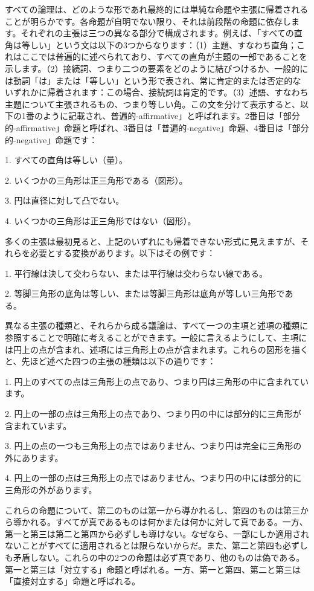 \documentclass[a4paper,11pt,openany]{ltjsbook}
\begin{document}
すべての論理は、どのような形であれ最終的には単純な命題や主張に帰着されることが明らかです。各命題が自明でない限り、それは前段階の命題に依存します。それぞれの主張は三つの異なる部分で構成されます。例えば、「すべての直角は等しい」という文は以下の3つからなります：（1）主題、すなわち直角；これはここでは普遍的に述べられており、すべての直角が主題の一部であることを示します。（2）接続詞、つまり二つの要素をどのように結びつけるか、一般的には動詞「は」または「等しい」という形で表され、常に肯定的または否定的ないずれかに帰着されます：この場合、接続詞は肯定的です。（3）述語、すなわち主題について主張されるもの、つまり等しい角。この文を分けて表示すると、以下の1番のように記載され、普遍的-affirmative」と呼ばれます。2番目は「部分的-affirmative」命題と呼ばれ、3番目は「普遍的-negative」命題、4番目は「部分的-negative」命題です：

1. すべての直角は等しい（量）。

2. いくつかの三角形は正三角形である（図形）。

3. 円は直径に対して凸でない。

4. いくつかの三角形は正三角形ではない（図形）。

多くの主張は最初見ると、上記のいずれにも帰着できない形式に見えますが、それらを必要とする変換があります。以下はその例です：

1. 平行線は決して交わらない、または平行線は交わらない線である。

2. 等脚三角形の底角は等しい、または等脚三角形は底角が等しい三角形である。

異なる主張の種類と、それらから成る議論は、すべて一つの主項と述項の種類に参照することで明確に考えることができます。一般に言えるようにして、主項には円上の点が含まれ、述項には三角形上の点が含まれます。これらの図形を描くと、先ほど述べた四つの主張の種類は以下の通りです：

1. 円上のすべての点は三角形上の点であり、つまり円は三角形の中に含まれています。

2. 円上の一部の点は三角形上の点であり、つまり円の中には部分的に三角形が含まれています。

3. 円上の点の一つも三角形上の点ではありません、つまり円は完全に三角形の外にあります。

4. 円上の一部の点は三角形上の点ではありません、つまり円の中には部分的に三角形の外があります。

これらの命題について、第二のものは第一から導かれるし、第四のものは第三から導かれる。すべてが真であるものは何かまたは何かに対して真である。一方、第一と第三は第二と第四から必ずしも導けない。なぜなら、一部にしか適用されないことがすべてに適用されるとは限らないからだ。また、第二と第四も必ずしも矛盾しない。これらの中の2つの命題は必ず真であり、他のものは偽である。第一と第三は「対立する」命題と呼ばれる。一方、第一と第四、第二と第三は「直接対立する」命題と呼ばれる。
\end{document}
